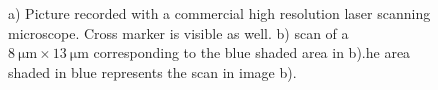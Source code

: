 		\begin{figure}[htp]
			\begin{subfigure}{ 0.49\linewidth}
				\centering
				\caption{}
				\label{subfig::cross_laser_scan}
			\end{subfigure}
			\hfill
			\begin{subfigure}{ 0.49\linewidth}
				\centering
				\caption{}
				\label{subfig::pp_pl_scan}
			\end{subfigure}
				\caption[Combining \fl and \lsm to identify \nds]{a) Picture recorded with a commercial high resolution laser scanning microscope. Cross marker is visible as well. b) \Pl scan of a $\SI{8}{\micro\metre} \times  \SI{13}{\micro\metre}$ corresponding to the blue shaded area in b).he area shaded in blue represents the \pl scan in image b).}
		\end{figure}



